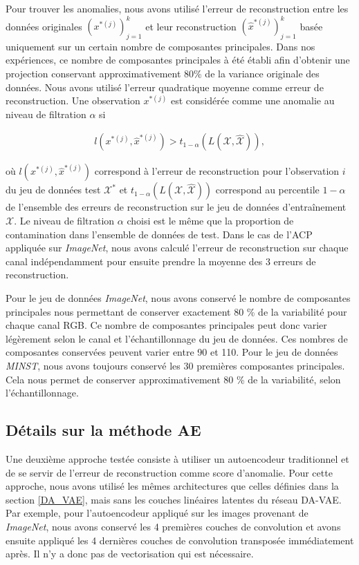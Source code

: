 Pour trouver les anomalies, nous avons utilisé l'erreur de reconstruction entre les données originales $(x^{*(j)})_{j=1}^k$ et
leur reconstruction $(\hat{x}^{*(j)})_{j=1}^k$ basée uniquement sur un certain nombre de composantes principales. Dans nos expériences, ce nombre de composantes principales à été établi afin d'obtenir une projection conservant approximativement 80\% de la variance originale des données. Nous avons utilisé l'erreur quadratique moyenne comme erreur de reconstruction. Une observation $x^{*(j)}$ est considérée comme une anomalie au niveau de filtration $\alpha$ si

\begin{gather} \label{eq:anomalie_mse}
l(x^{*(j)}, \hat{x}^{*(j)}) > t_{1-\alpha}(L(\mathcal{X}, \hat{\mathcal{X}})),
\end{gather}

où $l(x^{*(j)}, \hat{x}^{*(j)})$ correspond à l'erreur de reconstruction pour l'observation $i$ du jeu de données test $\mathcal{X^*}$ et $t_{1-\alpha}(L(\mathcal{X}, \hat{\mathcal{X}}))$ correspond au percentile $1-\alpha$ de l'ensemble des erreurs de reconstruction sur le jeu de données d'entraînement $\mathcal{X}$. Le niveau de filtration $\alpha$ choisi est le même que la proportion de contamination dans l'ensemble de données de test. Dans le cas de l'ACP appliquée sur \textit{ImageNet}, nous avons calculé l'erreur de reconstruction sur chaque canal indépendamment pour ensuite prendre la moyenne des 3 erreurs de reconstruction. 

 Pour le jeu de données \textit{ImageNet}, nous avons conservé le nombre de composantes principales nous permettant de conserver exactement 80 \% de la variabilité pour chaque canal RGB. Ce nombre de composantes principales peut donc varier légèrement selon le canal et l'échantillonnage du jeu de données. Ces nombres de composantes conservées peuvent varier entre 90 et 110. Pour le jeu de données \textit{MINST}, nous avons toujours conservé les 30 premières composantes principales. Cela nous permet de conserver approximativement  80 \% de la variabilité, selon l'échantillonnage. 

\subsection{Détails sur la méthode AE} \label{AE}

Une deuxième approche testée consiste à utiliser un autoencodeur traditionnel et de se servir de l'erreur de reconstruction comme score d'anomalie. Pour cette approche, nous avons utilisé les mêmes architectures que celles définies dans la section \ref{DA_VAE}, mais sans les couches linéaires latentes du réseau DA-VAE. Par exemple, pour l'autoencodeur appliqué sur les images provenant de \textit{ImageNet}, nous avons conservé les 4 premières couches de convolution et avons ensuite appliqué les 4 dernières couches de convolution transposée immédiatement après. Il n'y a donc pas de vectorisation qui est nécessaire. 

